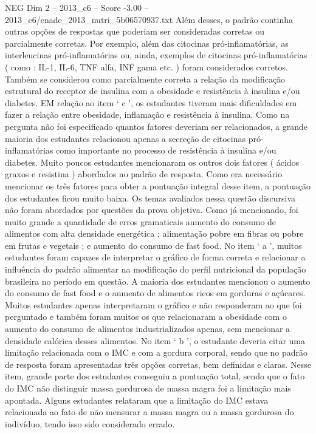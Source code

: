 \begin{textsample}{NEG Dim 2 – 2013\_c6 – Score -3.00 – 2013\_c6/enade\_2013\_nutri\_5b06570937.txt}
Além desses, o padrão continha outras opções de respostas que poderiam ser consideradas corretas ou parcialmente corretas.
Por exemplo, além das citocinas pró-inflamatórias, as interleucinas pró-inflamatórias ou, ainda, exemplos de citocinas pró-inflamatórias ( como : IL-1, IL-6, TNF alfa, INF gama etc. ) foram considerados corretos.
Também se considerou como parcialmente correta a relação da modificação estrutural do receptor de insulina com a obesidade e resistência à insulina e/ou diabetes.
EM relação ao item ‘ c ’, os estudantes tiveram mais dificuldades em fazer a relação entre obesidade, inflamação e resistência à insulina.
Como na pergunta não foi especificado quantos fatores deveriam ser relacionados, a grande maioria dos estudantes relacionou apenas a secreção de citocinas pró-inflamatórias como importante no processo de resistência à insulina e/ou diabetes.
Muito poucos estudantes mencionaram os outros dois fatores ( ácidos graxos e resistina ) abordados no padrão de resposta.
Como era necessário mencionar os três fatores para obter a pontuação integral desse item, a pontuação dos estudantes ficou muito baixa.
Os temas avaliados nessa questão discursiva não foram abordados por questões da prova objetiva.
Como já mencionado, foi muito grande a quantidade de erros gramaticais aumento do consumo de alimentos com alta densidade energética ; alimentação pobre em fibras ou pobre em frutas e vegetais ; e aumento do consumo de fast food.
No item ‘ a ’, muitos estudantes foram capazes de interpretar o gráfico de forma correta e relacionar a influência do padrão alimentar na modificação do perfil nutricional da população brasileira no período em questão.
A maioria dos estudantes mencionou o aumento do consumo de fast food e o aumento de alimentos ricos em gorduras e açúcares.
Muitos estudantes apenas interpretaram o gráfico e não responderam ao que foi perguntado e também foram muitos os que relacionaram a obesidade com o aumento do consumo de alimentos industrializados apenas, sem mencionar a densidade calórica desses alimentos.
No item ‘ b ’, o estudante deveria citar uma limitação relacionada com o IMC e com a gordura corporal, sendo que no padrão de resposta foram apresentadas três opções corretas, bem definidas e claras.
Nesse item, grande parte dos estudantes conseguiu a pontuação total, sendo que o fato do IMC não distinguir massa gordurosa de massa magra foi a limitação mais apontada.
Alguns estudantes relataram que a limitação do IMC estava relacionada ao fato de não mensurar a massa magra ou a massa gordurosa do indivíduo, tendo isso sido considerado errado.

\end{textsample}
